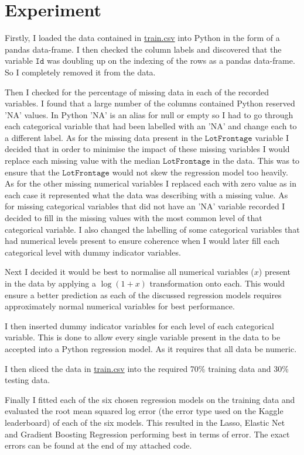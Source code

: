 \documentclass[a4paper]{article}
\begin{document}
\section{Experiment}
    Firstly, I loaded the data contained in \href{https://github.com/HStuklis/my-projects/blob/master/house-prices/train.csv}{train.csv} into Python in the form of a pandas data-frame. I then checked the column labels and discovered that the variable $\texttt{Id}$ was doubling up on the indexing of the rows as a pandas data-frame. So I completely removed it from the data.
    \par Then I checked for the percentage of missing data in each of the recorded variables. I found that a large number of the columns contained Python reserved 'NA' values. In Python 'NA' is an alias for null or empty so I had to go through each categorical variable that had been labelled with an 'NA' and change each to a different label. As for the missing data present in the $\texttt{LotFrontage}$ variable I decided that in order to minimise the impact of these missing variables I would replace each missing value with the median $\texttt{LotFrontage}$ in the data. This was to ensure that the $\texttt{LotFrontage}$ would not skew the regression model too heavily. As for the other missing numerical variables I replaced each with zero value as in each case it represented what the data was describing with a missing value. As for missing categorical variables that did not have an 'NA' variable recorded I decided to fill in the missing values with the most common level of that categorical variable. I also changed the labelling of some categorical variables that had numerical levels present to ensure coherence when I would later fill each categorical level with dummy indicator variables.
    \par Next I decided it would be best to normalise all numerical variables ($x$) present in the data by applying a $\log(1 + x)$ transformation onto each. This would ensure a better prediction as each of the discussed regression models requires approximately normal numerical variables for best performance.
    \par I then inserted dummy indicator variables for each level of each categorical variable. This is done to allow every single variable present in the data to be accepted into a Python regression model. As it requires that all data be numeric.
    \par I then sliced the data in \href{https://github.com/HStuklis/my-projects/blob/master/house-prices/train.csv}{train.csv} into the required 70\% training data and 30\% testing data.
    \par Finally I fitted each of the six chosen regression models on the training data and evaluated the root mean squared log error (the error type used on the Kaggle leaderboard) of each of the six models. This resulted in the Lasso, Elastic Net and Gradient Boosting Regression performing best in terms of error. The exact errors can be found at the end of my attached code.
\end{document}
